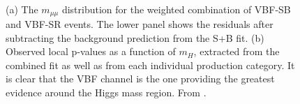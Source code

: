 \begin{figure}
    \myfloatalign
     \quad
     \\
    \caption[H$\rightarrow\mu^+\mu^-$]{(a) The $m_{\mu\mu}$ distribution for the weighted combination of VBF-SB and VBF-SR events. The lower panel shows the residuals after subtracting the background prediction from the S+B fit. (b) Observed local p-values as a function of $m_H$, extracted from the combined fit as well as from each individual production category. It is clear that the VBF channel is the one providing the greatest evidence around the Higgs mass region. From \cite{Sirunyan_2021}.}\label{fig:vbfmm}
\end{figure}
